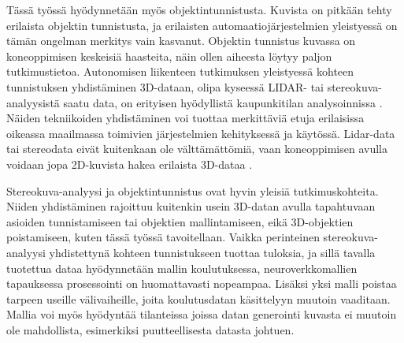 Tässä työssä hyödynnetään myös objektintunnistusta.
Kuvista on pitkään tehty erilaista objektin tunnistusta, ja erilaisten automaatiojärjestelmien yleistyessä on tämän ongelman merkitys vain kasvanut. 
Objektin tunnistus kuvassa on koneoppimisen keskeisiä haasteita, näin ollen aiheesta löytyy paljon tutkimustietoa.
Autonomisen liikenteen tutkimuksen yleistyessä kohteen tunnistuksen yhdistäminen 3D-dataan, olipa kyseessä LIDAR- tai stereokuva-analyysistä saatu data, on erityisen hyödyllistä kaupunkitilan analysoinnissa \cite{MengZeYu2024TODf}. Näiden tekniikoiden yhdistäminen voi tuottaa merkittäviä etuja erilaisissa oikeassa maailmassa toimivien järjestelmien kehityksessä ja käytössä.
Lidar-data tai stereodata eivät kuitenkaan ole välttämättömiä, vaan koneoppimisen avulla voidaan jopa 2D-kuvista hakea erilaista 3D-dataa \cite{MaXinzhu20243ODF}.


Stereokuva-analyysi ja objektintunnistus ovat hyvin yleisiä tutkimuskohteita.
Niiden yhdistäminen rajoittuu kuitenkin usein 3D-datan avulla tapahtuvaan asioiden tunnistamiseen tai objektien mallintamiseen, eikä 3D-objektien poistamiseen, kuten tässä työssä tavoitellaan.
Vaikka perinteinen stereokuva-analyysi yhdistettynä kohteen tunnistukseen tuottaa tuloksia, ja sillä tavalla tuotettua dataa hyödynnetään mallin koulutuksessa, neuroverkkomallien tapauksessa prosessointi on huomattavasti nopeampaa.
Lisäksi yksi malli poistaa tarpeen useille välivaiheille, joita koulutusdatan käsittelyyn muutoin vaaditaan.
Mallia voi myös hyödyntää tilanteissa joissa datan generointi kuvasta ei muutoin ole mahdollista, esimerkiksi puutteellisesta datasta johtuen.
